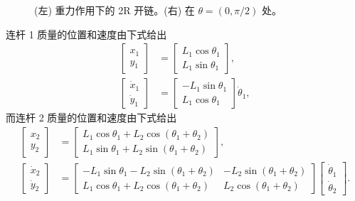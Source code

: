 \documentclass[12pt,a4paper]{article}
\begin{document}
\begin{figure}[h]
\centering
\caption{(左) 重力作用下的 2R 开链。(右) 在 $\theta = (0, \pi/2)$ 处。}
\label{fig:8.1}
\end{figure}

连杆 1 质量的位置和速度由下式给出
\begin{align}
\begin{bmatrix} x_1 \\ y_1 \end{bmatrix} &= \begin{bmatrix} L_1 \cos \theta_1 \\ L_1 \sin \theta_1 \end{bmatrix}, \\
\begin{bmatrix} \dot{x}_1 \\ \dot{y}_1 \end{bmatrix} &= \begin{bmatrix} -L_1 \sin \theta_1 \\ L_1 \cos \theta_1 \end{bmatrix} \dot{\theta}_1,
\end{align}
而连杆 2 质量的位置和速度由下式给出
\begin{align}
\begin{bmatrix} x_2 \\ y_2 \end{bmatrix} &= \begin{bmatrix} L_1 \cos \theta_1 + L_2 \cos(\theta_1 + \theta_2) \\ L_1 \sin \theta_1 + L_2 \sin(\theta_1 + \theta_2) \end{bmatrix}, \\
\begin{bmatrix} \dot{x}_2 \\ \dot{y}_2 \end{bmatrix} &= \begin{bmatrix} -L_1 \sin \theta_1 - L_2 \sin(\theta_1 + \theta_2) & -L_2 \sin(\theta_1 + \theta_2) \\ L_1 \cos \theta_1 + L_2 \cos(\theta_1 + \theta_2) & L_2 \cos(\theta_1 + \theta_2) \end{bmatrix} \begin{bmatrix} \dot{\theta}_1 \\ \dot{\theta}_2 \end{bmatrix}.
\end{align}
\end{document}
